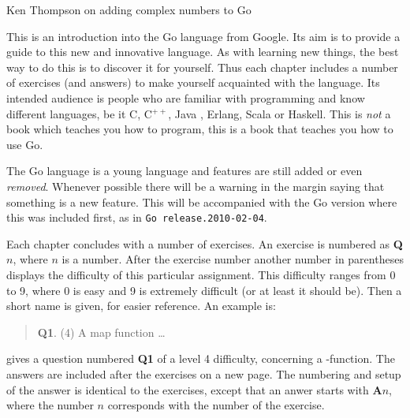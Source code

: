 {Ken Thompson on adding complex numbers to Go}\noindent

This is an introduction into the Go language from Google. Its aim
is to provide a guide to this new and innovative language. As with
learning new things, the best way to do this is to discover it for
yourself. Thus each chapter includes a number of exercises (and answers)
to make yourself acquainted with the language.
Its intended audience is people who are familiar with programming
and know different languages, be it C\cite{c}, C$^{++}$\cite{c++}, 
Java \cite{java}, Erlang\cite{erlang}, Scala\cite{scala} or
Haskell\cite{haskell}. This is \emph{not} a book which teaches you how to 
program, this is a book that teaches you how to use Go.

\begin{lbar}
\noindent The Go language is a young language and
features are still added or even \emph{removed}. Whenever
possible there will be a warning in the margin saying that
something is a new feature. This will be accompanied with
the Go version where this was included first, as in
\texttt{\tiny{}Go release.2010-02-04}.
\end{lbar}

Each chapter concludes with a number of exercises. An exercise
is numbered as \textbf{Q$n$}, where $n$ is a number. After the
exercise number another number in parentheses displays the difficulty
of this particular assignment. This difficulty ranges from 0 to 9, where
0 is easy and 9 is extremely difficult (or at least it should be).
Then a short name is given, for easier reference.
An example is:
\begin{verse}
\textbf{Q1}. (4) A map function \ldots
\end{verse}
    
\noindent gives a question numbered \textbf{Q1} of a level 4 difficulty, concerning a
-function. The answers are included after the exercises on a
new page.
The numbering and setup of the answer is identical to the
exercises, except that an anwer starts with \textbf{A$n$}, where the
number $n$ corresponds with the number of the exercise.

